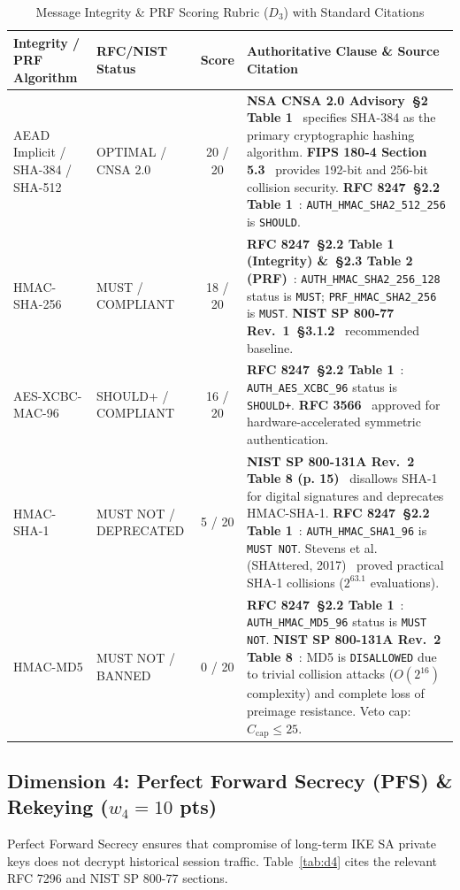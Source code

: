\documentclass[11pt,a4paper]{article}
\begin{document}
\begin{table}[h!]
\centering
\small
\begin{tabularx}{\textwidth}{llcX}
\toprule
\textbf{Integrity / PRF Algorithm} & \textbf{RFC/NIST Status} & \textbf{Score} & \textbf{Authoritative Clause \& Source Citation} \\
\midrule
AEAD Implicit / SHA-384 / SHA-512 & OPTIMAL / CNSA 2.0 & 20 / 20 & \textbf{NSA CNSA 2.0 Advisory~\S 2 Table 1}~\cite{cnsa2} specifies SHA-384 as the primary cryptographic hashing algorithm. \textbf{FIPS 180-4 Section 5.3}~\cite{fips180-4} provides 192-bit and 256-bit collision security. \textbf{RFC 8247~\S 2.2 Table 1}~\cite{rfc8247}: \texttt{AUTH\_HMAC\_SHA2\_512\_256} is \texttt{SHOULD}. \\
\addlinespace
HMAC-SHA-256 & MUST / COMPLIANT & 18 / 20 & \textbf{RFC 8247~\S 2.2 Table 1 (Integrity) \&~\S 2.3 Table 2 (PRF)}~\cite{rfc8247}: \texttt{AUTH\_HMAC\_SHA2\_256\_128} status is \texttt{MUST}; \texttt{PRF\_HMAC\_SHA2\_256} is \texttt{MUST}. \textbf{NIST SP 800-77 Rev.~1~\S 3.1.2}~\cite{nist800-77r1} recommended baseline. \\
\addlinespace
AES-XCBC-MAC-96 & SHOULD+ / COMPLIANT & 16 / 20 & \textbf{RFC 8247~\S 2.2 Table 1}~\cite{rfc8247}: \texttt{AUTH\_AES\_XCBC\_96} status is \texttt{SHOULD+}. \textbf{RFC 3566}~\cite{rfc3566} approved for hardware-accelerated symmetric authentication. \\
\addlinespace
HMAC-SHA-1 & MUST NOT / DEPRECATED & 5 / 20 & \textbf{NIST SP 800-131A Rev.~2 Table 8 (p. 15)}~\cite{nist800-131ar2} disallows SHA-1 for digital signatures and deprecates HMAC-SHA-1. \textbf{RFC 8247~\S 2.2 Table 1}~\cite{rfc8247}: \texttt{AUTH\_HMAC\_SHA1\_96} is \texttt{MUST NOT}. Stevens et al. (SHAttered, 2017)~\cite{shattered} proved practical SHA-1 collisions ($2^{63.1}$ evaluations). \\
\addlinespace
HMAC-MD5 & MUST NOT / BANNED & 0 / 20 & \textbf{RFC 8247~\S 2.2 Table 1}~\cite{rfc8247}: \texttt{AUTH\_HMAC\_MD5\_96} status is \texttt{MUST NOT}. \textbf{NIST SP 800-131A Rev.~2 Table 8}~\cite{nist800-131ar2}: MD5 is \texttt{DISALLOWED} due to trivial collision attacks ($O(2^{16})$ complexity) and complete loss of preimage resistance. Veto cap: $C_{\text{cap}} \le 25$. \\
\bottomrule
\end{tabularx}
\caption{Message Integrity \& PRF Scoring Rubric ($D_3$) with Standard Citations}
\label{tab:d3}
\end{table}

\subsection{Dimension 4: Perfect Forward Secrecy (PFS) \& Rekeying ($w_4 = 10$ pts)}
Perfect Forward Secrecy ensures that compromise of long-term IKE SA private keys does not decrypt historical session traffic. Table~\ref{tab:d4} cites the relevant RFC 7296 and NIST SP 800-77 sections.
\end{document}
